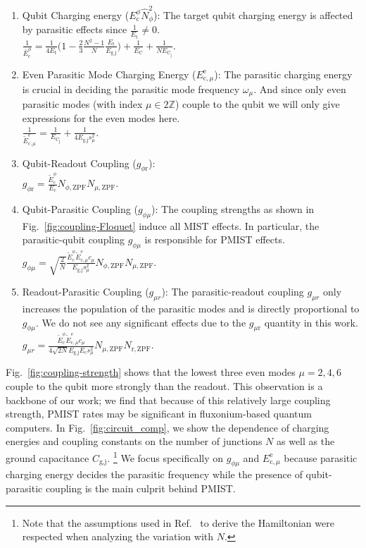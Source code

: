\documentclass[%
reprint,
superscriptaddress,
 amsmath,amssymb,
 aps,
 prx,
longbibliography,
floatfix,
]{revtex4-2}
\begin{document}
\begin{enumerate}
    \item Qubit Charging energy ($E_{\textrm{c}}^\phi \hat N_{\phi}^2$): The target qubit charging energy is affected by parasitic effects since $\frac{1}{E_\textrm{t}}\neq 0$.\\ $\frac{1}{\bar{E}_\textrm{c}^\phi}=\frac{1}{4E_{\textrm{t}}}\Big(1-\frac{2}{3}\frac{N^2-1}{N}\frac{E_{\textrm{t}}}{E_{\textrm{g,j}}}\Big)+\frac{1}{E_{\textrm{C}}}+\frac{1}{NE_{\textrm{C}_\textrm{j}}}$.
    \item Even Parasitic Mode Charging Energy ($E_{\textrm{c},\mu}^\textrm{e}$): The parasitic charging energy is crucial in deciding the parasitic mode frequency $\omega_{\mu}$. And since only even parasitic modes (with index $\mu\in 2\mathbb{Z}$) couple to the qubit we will only give expressions for the even modes here.\\ $\frac{1}{\tilde{E}_{\textrm{c},\mu}^{e}}=\frac{1}{E_{\textrm{C}_\textrm{j}}}+\frac{1}{4E_{\textrm{g,j}}s_\mu^2}.$ 
    \item Qubit-Readout Coupling ($g_{\phi \textrm{r}}$):\\ $g_{\phi \textrm{r}}=\frac{\tilde{E}_\textrm{c}^\phi}{E_{\textrm{c}}} N_{\phi,\mathrm{ZPF}}N_{\mu,\mathrm{ZPF}}.$
    \item Qubit-Parasitic Coupling ($g_{\phi\mu}$): The coupling strengths as shown in Fig.~\ref{fig:coupling-Floquet} induce all MIST effects. In particular, the parasitic-qubit coupling $g_{\phi\mu}$ is responsible for PMIST effects.\\ $g_{\phi\mu}=\sqrt{\frac{2}{N}} \frac{\tilde{E}^\phi_\textrm{c}\tilde{E}^\textrm{e}_{\textrm{c},\mu}c_\mu}{E_{\textrm{g,j}}s_\mu^2} N_{\phi,\mathrm{ZPF}} N_{\mu,\mathrm{ZPF}}.$
    \item Readout-Parasitic Coupling ($g_{\mu r}$): The parasitic-readout coupling $g_{\mu r}$ only increases the population of the parasitic modes and is directly proportional to $g_{\phi\mu}$. We do not see any significant effects due to the $g_{\mu \textrm{r}}$ quantity in this work.\\ $g_{\mu r}=\frac{\tilde{E}^\phi_\textrm{c}\tilde{E}^\textrm{e}_{\textrm{c},\mu}c_\mu}{4\sqrt{2N}E_{\textrm{g,j}}E_{\textrm{c}}s_\mu^2} N_{\mu,\mathrm{ZPF}}N_{\textrm{r},\mathrm{ZPF}}.$   
    \end{enumerate}
    Fig.~\ref{fig:coupling-strength} shows that the lowest three even modes $\mu=2,4,6$ couple to the qubit more strongly than the readout. This observation is a backbone of our work; we find that because of this relatively large coupling strength, PMIST rates may be significant in fluxonium-based quantum computers. In Fig.~\ref{fig:circuit_comp}, we show the dependence of charging energies and coupling constants on the number of junctions $N$ as well as the ground capacitance $C_\textrm{g,j}$. \footnote{Note that the assumptions used in Ref.~\cite{viola2015collective} to derive the Hamiltonian were respected when analyzing the variation with $N$.} We focus specifically on $g_{\phi\mu}$ and $E_{\textrm{c},\mu}^\textrm{e}$ because parasitic charging energy decides the parasitic frequency while the presence of qubit-parasitic coupling is the main culprit behind PMIST.
\end{document}
